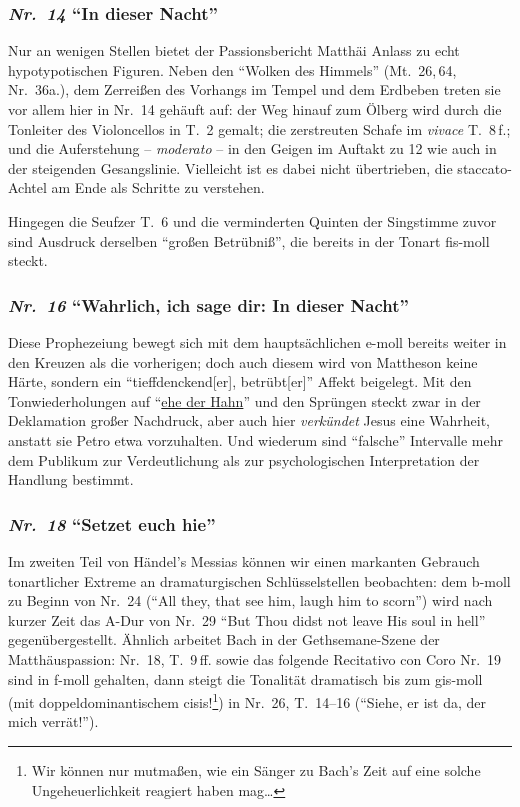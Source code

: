 \documentclass[a4paper,11pt,twoside]{scrartcl}
\newcommand{\Nr}[1]{\textmd{\textit{Nr.~#1}}}
\begin{document}
\subsubsection*{\Nr{14} \enquote{In dieser Nacht}}
Nur an wenigen Stellen bietet der Passionsbericht Matthäi Anlass zu
echt hypotypotischen Figuren.  Neben den \enquote{Wolken des Himmels}
(Mt.~26,\,64, Nr.~36a.), dem Zerreißen des Vorhangs im Tempel und dem
Erdbeben treten sie vor allem hier in Nr.~14 gehäuft auf: der Weg
hinauf zum Ölberg wird durch die Tonleiter des Violoncellos in T.~2
gemalt; die zerstreuten Schafe im \textit{vivace} T.~8\,f.; und die
Auferstehung – \textit{moderato} – in den Geigen im Auftakt
zu 12 wie auch in der steigenden Gesangslinie.  Vielleicht ist es
dabei nicht übertrieben, die stac\-ca\-to-Ach\-tel am Ende als
Schritte zu verstehen.

Hingegen die Seufzer T.~6 und die verminderten Quinten der Singstimme
zuvor sind Ausdruck derselben \enquote{großen Betrübniß}\cite[S.~251]{mattheson},
die bereits in der Tonart fis-moll steckt.

\subsubsection*{\Nr{16} \enquote{Wahrlich, ich sage dir: In dieser Nacht}}
Diese Prophezeiung bewegt sich mit dem hauptsächlichen e-moll bereits
weiter in den Kreuzen als die vorherigen; doch auch diesem wird von
Mattheson keine Härte, sondern ein \enquote{tieffdenckend[er],
betrübt[er]} Affekt beigelegt.  Mit den Tonwiederholungen auf
\enquote{\underline{ehe der Hahn}} und den Sprüngen steckt zwar in
der Deklamation großer Nachdruck, aber auch hier \emph{verkündet}
Jesus eine Wahrheit, anstatt sie Petro etwa vorzuhalten.  Und
wiederum sind \enquote{falsche} Intervalle mehr dem Publikum zur
Verdeutlichung als zur psychologischen Interpretation der Handlung
bestimmt.

\subsubsection*{\Nr{18} \enquote{Setzet euch hie}}
Im zweiten Teil von Händel’s Messias können wir einen markanten
Gebrauch tonartlicher Extreme an dramaturgischen Schlüsselstellen
beobachten: dem b-moll zu Beginn von Nr.~24 (\foreignquote{english}
{All they, that see him, laugh him to scorn}) wird nach kurzer Zeit
das A-Dur von Nr.~29 \foreignquote{english}{But Thou didst not leave
His soul in hell} gegenübergestellt.  Ähnlich arbeitet Bach in der
Gethsemane-Szene der Matthäuspassion: Nr.~18, T.~9\,ff. sowie das
folgende Recitativo con Coro Nr.~19 sind in f-moll gehalten,
dann steigt die Tonalität dramatisch bis zum gis-moll (mit
doppeldominantischem cisis!\footnote{Wir können nur mutmaßen, wie
ein Sänger zu Bach’s Zeit auf eine solche Ungeheuerlichkeit reagiert
haben mag…}) in Nr.~26, T.~14–16 (\enquote{Siehe, er ist da, der
mich verrät!}).
\end{document}
